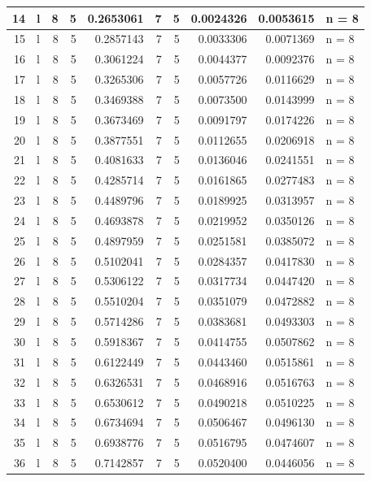 \documentclass[
  letterpaper,
  DIV=11,
  numbers=noendperiod]{scrreprt}
\begin{document}
\begin{table}
\begin{tabular}[t]{r|l|r|r|r|r|r|r|r|l}
\hline
14 & l & 8 & 5 & 0.2653061 & 7 & 5 & 0.0024326 & 0.0053615 & n = 8\\
\hline
15 & l & 8 & 5 & 0.2857143 & 7 & 5 & 0.0033306 & 0.0071369 & n = 8\\
\hline
16 & l & 8 & 5 & 0.3061224 & 7 & 5 & 0.0044377 & 0.0092376 & n = 8\\
\hline
17 & l & 8 & 5 & 0.3265306 & 7 & 5 & 0.0057726 & 0.0116629 & n = 8\\
\hline
18 & l & 8 & 5 & 0.3469388 & 7 & 5 & 0.0073500 & 0.0143999 & n = 8\\
\hline
19 & l & 8 & 5 & 0.3673469 & 7 & 5 & 0.0091797 & 0.0174226 & n = 8\\
\hline
20 & l & 8 & 5 & 0.3877551 & 7 & 5 & 0.0112655 & 0.0206918 & n = 8\\
\hline
21 & l & 8 & 5 & 0.4081633 & 7 & 5 & 0.0136046 & 0.0241551 & n = 8\\
\hline
22 & l & 8 & 5 & 0.4285714 & 7 & 5 & 0.0161865 & 0.0277483 & n = 8\\
\hline
23 & l & 8 & 5 & 0.4489796 & 7 & 5 & 0.0189925 & 0.0313957 & n = 8\\
\hline
24 & l & 8 & 5 & 0.4693878 & 7 & 5 & 0.0219952 & 0.0350126 & n = 8\\
\hline
25 & l & 8 & 5 & 0.4897959 & 7 & 5 & 0.0251581 & 0.0385072 & n = 8\\
\hline
26 & l & 8 & 5 & 0.5102041 & 7 & 5 & 0.0284357 & 0.0417830 & n = 8\\
\hline
27 & l & 8 & 5 & 0.5306122 & 7 & 5 & 0.0317734 & 0.0447420 & n = 8\\
\hline
28 & l & 8 & 5 & 0.5510204 & 7 & 5 & 0.0351079 & 0.0472882 & n = 8\\
\hline
29 & l & 8 & 5 & 0.5714286 & 7 & 5 & 0.0383681 & 0.0493303 & n = 8\\
\hline
30 & l & 8 & 5 & 0.5918367 & 7 & 5 & 0.0414755 & 0.0507862 & n = 8\\
\hline
31 & l & 8 & 5 & 0.6122449 & 7 & 5 & 0.0443460 & 0.0515861 & n = 8\\
\hline
32 & l & 8 & 5 & 0.6326531 & 7 & 5 & 0.0468916 & 0.0516763 & n = 8\\
\hline
33 & l & 8 & 5 & 0.6530612 & 7 & 5 & 0.0490218 & 0.0510225 & n = 8\\
\hline
34 & l & 8 & 5 & 0.6734694 & 7 & 5 & 0.0506467 & 0.0496130 & n = 8\\
\hline
35 & l & 8 & 5 & 0.6938776 & 7 & 5 & 0.0516795 & 0.0474607 & n = 8\\
\hline
36 & l & 8 & 5 & 0.7142857 & 7 & 5 & 0.0520400 & 0.0446056 & n = 8\\

\end{tabular}
\end{table}
\end{document}
